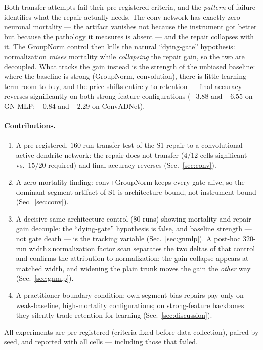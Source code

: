 \documentclass[review]{elsarticle}
\begin{document}
Both transfer attempts fail their pre-registered criteria, and the
\emph{pattern} of failure identifies what the repair actually needs.
The conv network has exactly zero neuronal mortality --- the artifact
vanishes not because the instrument got better but because the
pathology it measures is absent --- and the repair collapses with it.
The GroupNorm control then kills the natural ``dying-gate'' hypothesis:
normalization \emph{raises} mortality while \emph{collapsing} the
repair gain, so the two are decoupled. What tracks the gain instead is
the strength of the unbiased baseline: where the baseline is strong
(GroupNorm, convolution), there is little learning-term room to buy,
and the price shifts entirely to retention --- final accuracy
reverses significantly on both strong-feature configurations
($-3.88$ and $-6.55$ on GN-MLP; $-0.84$ and $-2.29$ on ConvADNet).

\paragraph{Contributions.}
\begin{enumerate}
\item A pre-registered, $160$-run transfer test of the S1 repair to a
convolutional active-dendrite network: the repair does not transfer
($4/12$ cells significant vs.\ $15/20$ required) and final accuracy
reverses (Sec.~\ref{sec:conv}).
\item A zero-mortality finding: conv+GroupNorm keeps every gate
alive, so the dominant-segment artifact of S1 is architecture-bound,
not instrument-bound (Sec.~\ref{sec:conv}).
\item A decisive same-architecture control ($80$ runs) showing
mortality and repair-gain decouple: the ``dying-gate''
hypothesis is false, and baseline strength --- not gate death --- is
the tracking variable (Sec.~\ref{sec:gnmlp}). A post-hoc
$320$-run width$\times$normalization factor scan separates the two
deltas of that control and confirms the attribution to normalization:
the gain collapse appears at matched width, and widening the plain
trunk moves the gain the \emph{other} way (Sec.~\ref{sec:gnmlp}).
\item A practitioner boundary condition: own-segment bias repairs pay
only on weak-baseline, high-mortality configurations; on
strong-feature backbones they silently trade retention for learning
(Sec.~\ref{sec:discussion}).
\end{enumerate}

All experiments are pre-registered (criteria fixed before data
collection), paired by seed, and reported with all cells --- including
those that failed.
\end{document}

